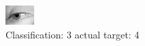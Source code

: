 \begin{figure}[h!]
\begin{center}
\includegraphics[width=0.60\columnwidth]{figures/ID3028_class_3_target_4.png}
\end{center}
\caption{ Classification: 3 actual target: 4}
\label{fig:ID3028_class_3_target_4}
\end{figure}
